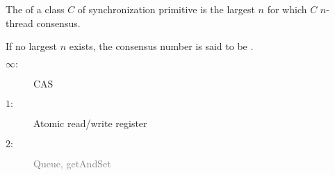 \begin{frame}{}
  \begin{definition}
    The  of a class $C$ of synchronization primitive 
    is the largest $n$ for which $C$  $n$-thread consensus.

    \vspace{0.30cm}
    If no largest $n$ exists, the consensus number is said to be .
  \end{definition}
\end{frame}

\begin{frame}{}
  \begin{center}

  \end{center}

\end{frame}

\begin{frame}{}
  \begin{theorem}
  \end{theorem}

  \pause
  \begin{description}
    \item[$\infty:$] CAS
    \item[$1:$] Atomic read/write register
    \item[$2:$] \textcolor{gray}{Queue, getAndSet}
  \end{description}
\end{frame}
